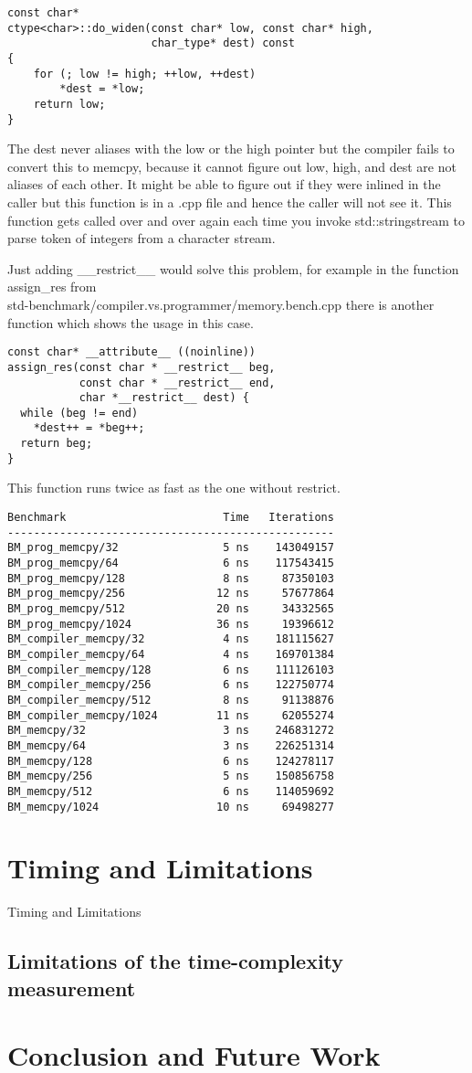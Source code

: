 \documentclass{sig-alternate}
\begin{document}
\begin{verbatim}
const char*
ctype<char>::do_widen(const char* low, const char* high,
                      char_type* dest) const
{
    for (; low != high; ++low, ++dest)
        *dest = *low;
    return low;
}
\end{verbatim}

The dest never aliases with the low or the high pointer but the compiler fails
to convert this to memcpy, because it cannot figure out low, high, and dest are
not aliases of each other.  It might be able to figure out if they were inlined
in the caller but this function is in a .cpp file and hence the caller will not
see it. This function gets called over and over again each time you invoke
std::stringstream to parse token of integers from a character stream.

Just adding \_\_restrict\_\_ would solve this problem, for example in the
function assign\_res
from\\ std-benchmark/compiler.vs.programmer/memory.bench.cpp there is another
function which shows the usage in this case.

\begin{verbatim}
const char* __attribute__ ((noinline))
assign_res(const char * __restrict__ beg,
           const char * __restrict__ end,
           char *__restrict__ dest) {
  while (beg != end)
    *dest++ = *beg++;
  return beg;
}
\end{verbatim}

This function runs twice as fast as the one without restrict.

\begin{verbatim}
Benchmark                        Time   Iterations
--------------------------------------------------
BM_prog_memcpy/32                5 ns    143049157
BM_prog_memcpy/64                6 ns    117543415
BM_prog_memcpy/128               8 ns     87350103
BM_prog_memcpy/256              12 ns     57677864
BM_prog_memcpy/512              20 ns     34332565
BM_prog_memcpy/1024             36 ns     19396612
BM_compiler_memcpy/32            4 ns    181115627
BM_compiler_memcpy/64            4 ns    169701384
BM_compiler_memcpy/128           6 ns    111126103
BM_compiler_memcpy/256           6 ns    122750774
BM_compiler_memcpy/512           8 ns     91138876
BM_compiler_memcpy/1024         11 ns     62055274
BM_memcpy/32                     3 ns    246831272
BM_memcpy/64                     3 ns    226251314
BM_memcpy/128                    6 ns    124278117
BM_memcpy/256                    5 ns    150856758
BM_memcpy/512                    6 ns    114059692
BM_memcpy/1024                  10 ns     69498277
\end{verbatim}


\section{Timing and Limitations}
Timing and Limitations
\subsection{Limitations of the time-complexity measurement}

\section{Conclusion and Future Work}


{\small

}
\end{document}
